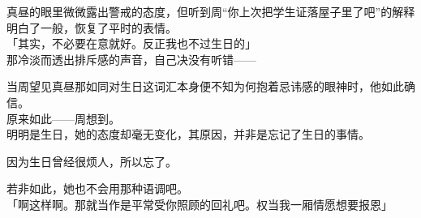 真昼的眼里微微露出警戒的态度，但听到周“你上次把学生证落屋子里了吧”的解释明白了一般，恢复了平时的表情。\\

「其实，不必要在意就好。反正我也不过生日的」\\

那冷淡而透出排斥感的声音，自己决没有听错——

当周望见真昼那如同对生日这词汇本身便不知为何抱着忌讳感的眼神时，他如此确信。\\

原来如此——周想到。\\

明明是生日，她的态度却毫无变化，其原因，并非是忘记了生日的事情。

因为生日曾经很烦人，所以忘了。

若非如此，她也不会用那种语调吧。\\

「啊这样啊。那就当作是平常受你照顾的回礼吧。权当我一厢情愿想要报恩」\\


